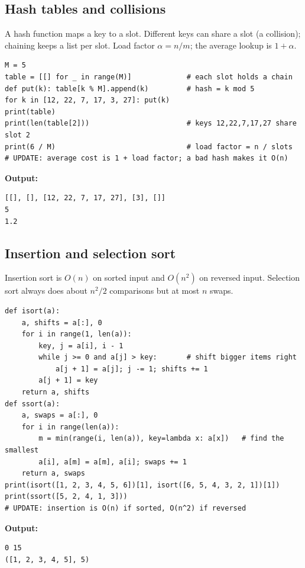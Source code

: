 \documentclass[11pt]{article}
\begin{document}
\subsection*{Hash tables and collisions}
A hash function maps a key to a slot. Different keys can share a slot (a collision); chaining keeps a list per slot. Load factor $\alpha=n/m$; the average lookup is $1+\alpha$.
\begin{Verbatim}[fontsize=\footnotesize,frame=single]
M = 5
table = [[] for _ in range(M)]             # each slot holds a chain
def put(k): table[k % M].append(k)         # hash = k mod 5
for k in [12, 22, 7, 17, 3, 27]: put(k)
print(table)
print(len(table[2]))                       # keys 12,22,7,17,27 share slot 2
print(6 / M)                               # load factor = n / slots
# UPDATE: average cost is 1 + load factor; a bad hash makes it O(n)
\end{Verbatim}
\textbf{Output:}
\begin{Verbatim}[fontsize=\footnotesize,frame=single]
[[], [], [12, 22, 7, 17, 27], [3], []]
5
1.2
\end{Verbatim}
\subsection*{Insertion and selection sort}
Insertion sort is $O(n)$ on sorted input and $O(n^2)$ on reversed input. Selection sort always does about $n^2/2$ comparisons but at most $n$ swaps.
\begin{Verbatim}[fontsize=\footnotesize,frame=single]
def isort(a):
    a, shifts = a[:], 0
    for i in range(1, len(a)):
        key, j = a[i], i - 1
        while j >= 0 and a[j] > key:       # shift bigger items right
            a[j + 1] = a[j]; j -= 1; shifts += 1
        a[j + 1] = key
    return a, shifts
def ssort(a):
    a, swaps = a[:], 0
    for i in range(len(a)):
        m = min(range(i, len(a)), key=lambda x: a[x])   # find the smallest
        a[i], a[m] = a[m], a[i]; swaps += 1
    return a, swaps
print(isort([1, 2, 3, 4, 5, 6])[1], isort([6, 5, 4, 3, 2, 1])[1])
print(ssort([5, 2, 4, 1, 3]))
# UPDATE: insertion is O(n) if sorted, O(n^2) if reversed
\end{Verbatim}
\textbf{Output:}
\begin{Verbatim}[fontsize=\footnotesize,frame=single]
0 15
([1, 2, 3, 4, 5], 5)
\end{Verbatim}
\end{document}
